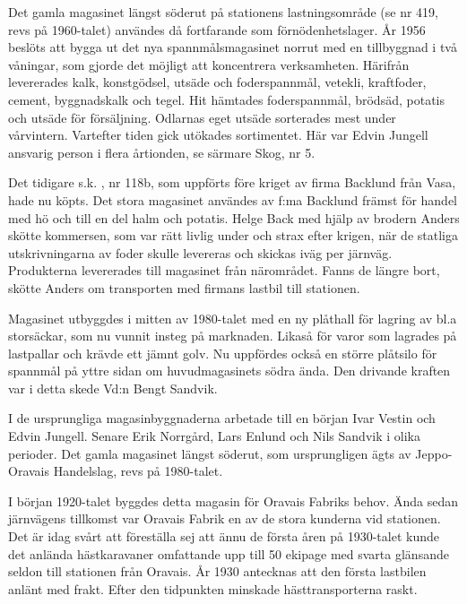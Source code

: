 Det gamla magasinet längst söderut på stationens lastningsområde (se nr 419, revs på 1960-talet) användes då fortfarande som förnödenhetslager. År 1956 beslöts att bygga ut det nya spannmålsmagasinet norrut med en tillbyggnad i två våningar, som gjorde det möjligt att koncentrera verksamheten. Härifrån levererades kalk, konstgödsel, utsäde och foderspannmål, vetekli, kraftfoder, cement, byggnadskalk och tegel. Hit hämtades foderspannmål, brödsäd, potatis och utsäde för försäljning. Odlarnas eget utsäde sorterades mest under vårvintern. Vartefter tiden gick utökades sortimentet. Här var Edvin Jungell ansvarig person i flera årtionden, se särmare Skog, nr 5.


Det tidigare s.k. , nr 118b, som uppförts före kriget av firma Backlund från Vasa, hade nu köpts. Det stora magasinet användes av f:ma Backlund främst för handel med hö och till en del halm och potatis. Helge Back med hjälp av brodern Anders skötte kommersen, som var rätt livlig under och strax efter krigen, när de statliga utskrivningarna av foder skulle levereras och skickas iväg per järnväg. Produkterna levererades till magasinet från närområdet. Fanns de längre bort, skötte Anders om transporten med firmans lastbil till stationen.

Magasinet utbyggdes i mitten av 1980-talet med en ny plåthall för lagring av bl.a storsäckar, som nu vunnit insteg på marknaden. Likaså för varor som lagrades på lastpallar och krävde ett jämnt golv. Nu uppfördes också en större plåtsilo för spannmål på yttre sidan om huvudmagasinets södra ända. Den drivande kraften var i detta skede Vd:n Bengt Sandvik.

I de ursprungliga magasinbyggnaderna arbetade till en början Ivar Vestin och Edvin Jungell. Senare Erik Norrgård, Lars Enlund och Nils Sandvik i olika perioder. Det gamla magasinet längst söderut, som ursprungligen ägts av Jeppo-Oravais Handelslag, revs på 1980-talet.




\jhnooccupant{}


I  början 1920-talet byggdes detta magasin för Oravais Fabriks behov. Ända sedan järnvägens tillkomst var Oravais Fabrik en av de stora kunderna vid stationen. Det är idag svårt att föreställa sej att ännu de första åren på 1930-talet kunde det anlända hästkaravaner omfattande upp till 50 ekipage med svarta glänsande seldon till stationen från Oravais. År 1930 antecknas att den första lastbilen anlänt med frakt. Efter den tidpunkten minskade hästtransporterna raskt.

